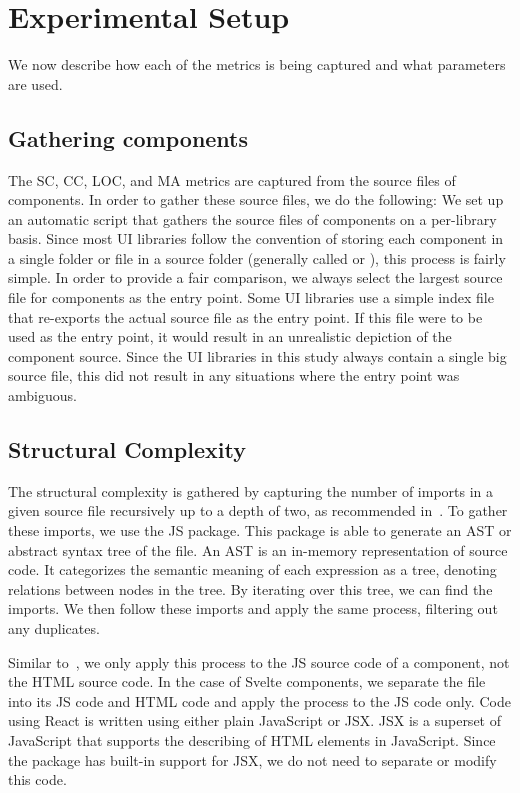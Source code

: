 \chapter{Experimental Setup}\label{chap:experimental-setup}
We now describe how each of the metrics is being captured and what parameters are used.

\section{Gathering components}\label{sec:experimental-setup:gathering-components}
The SC, CC, LOC, and MA metrics are captured from the source files of components. In order to gather these source files, we do the following: We set up an automatic script that gathers the source files of components on a per-library basis. Since most UI libraries follow the convention of storing each component in a single folder or file in a source folder (generally called  or ), this process is fairly simple. In order to provide a fair comparison, we always select the largest source file for components as the entry point. Some UI libraries use a simple index file that re-exports the actual source file as the entry point. If this file were to be used as the entry point, it would result in an unrealistic depiction of the component source. Since the UI libraries in this study always contain a single big source file, this did not result in any situations where the entry point was ambiguous.

\section{Structural Complexity}
The structural complexity is gathered by capturing the number of imports in a given source file recursively up to a depth of two, as recommended in~\cite{martinez-ortiz2016quality}. To gather these imports, we use the  JS package. This package is able to generate an AST or abstract syntax tree of the file. An AST is an in-memory representation of source code. It categorizes the semantic meaning of each expression as a tree, denoting relations between nodes in the tree. By iterating over this tree, we can find the imports. We then follow these imports and apply the same process, filtering out any duplicates.

Similar to~\cite{martinez-ortiz2016quality}, we only apply this process to the JS source code of a component, not the HTML source code. In the case of Svelte components, we separate the file into its JS code and HTML code and apply the process to the JS code only. Code using React is written using either plain JavaScript or JSX. JSX is a superset of JavaScript that supports the describing of HTML elements in JavaScript. Since the  package has built-in support for JSX, we do not need to separate or modify this code.

